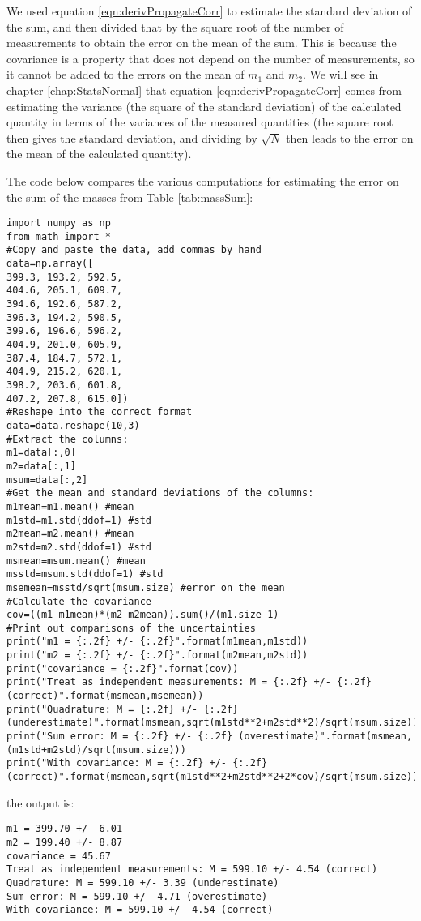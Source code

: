 We used equation \ref{eqn:derivPropagateCorr} to estimate the standard deviation of the sum, and then divided that by the square root of the number of measurements to obtain the error on the mean of the sum. This is because the covariance is a property that does not depend on the number of measurements, so it cannot be added to the errors on the mean of $m_1$ and $m_2$. We will see in chapter \ref{chap:StatsNormal} that equation \ref{eqn:derivPropagateCorr} comes from estimating the variance (the square of the standard deviation) of the calculated quantity in terms of the variances of the measured quantities (the square root then gives the standard deviation, and dividing by $\sqrt{N}$ then leads to the error on the mean of the calculated quantity).

The code below compares the various computations for estimating the error on the sum of the masses from Table \ref{tab:massSum}:
\begin{lstlisting}[frame=single] 
import numpy as np
from math import *
#Copy and paste the data, add commas by hand
data=np.array([
399.3, 193.2, 592.5,
404.6, 205.1, 609.7,
394.6, 192.6, 587.2,
396.3, 194.2, 590.5,
399.6, 196.6, 596.2,
404.9, 201.0, 605.9,
387.4, 184.7, 572.1,
404.9, 215.2, 620.1,
398.2, 203.6, 601.8,
407.2, 207.8, 615.0])
#Reshape into the correct format
data=data.reshape(10,3)
#Extract the columns:
m1=data[:,0]
m2=data[:,1]
msum=data[:,2]
#Get the mean and standard deviations of the columns:
m1mean=m1.mean() #mean
m1std=m1.std(ddof=1) #std
m2mean=m2.mean() #mean
m2std=m2.std(ddof=1) #std
msmean=msum.mean() #mean
msstd=msum.std(ddof=1) #std
msemean=msstd/sqrt(msum.size) #error on the mean
#Calculate the covariance
cov=((m1-m1mean)*(m2-m2mean)).sum()/(m1.size-1)
#Print out comparisons of the uncertainties
print("m1 = {:.2f} +/- {:.2f}".format(m1mean,m1std))
print("m2 = {:.2f} +/- {:.2f}".format(m2mean,m2std))
print("covariance = {:.2f}".format(cov))
print("Treat as independent measurements: M = {:.2f} +/- {:.2f} (correct)".format(msmean,msemean))
print("Quadrature: M = {:.2f} +/- {:.2f} (underestimate)".format(msmean,sqrt(m1std**2+m2std**2)/sqrt(msum.size)))
print("Sum error: M = {:.2f} +/- {:.2f} (overestimate)".format(msmean,(m1std+m2std)/sqrt(msum.size)))
print("With covariance: M = {:.2f} +/- {:.2f} (correct)".format(msmean,sqrt(m1std**2+m2std**2+2*cov)/sqrt(msum.size)))
\end{lstlisting}
the output is:
\begin{verbatim}
m1 = 399.70 +/- 6.01
m2 = 199.40 +/- 8.87
covariance = 45.67
Treat as independent measurements: M = 599.10 +/- 4.54 (correct)
Quadrature: M = 599.10 +/- 3.39 (underestimate)
Sum error: M = 599.10 +/- 4.71 (overestimate)
With covariance: M = 599.10 +/- 4.54 (correct)
\end{verbatim}

